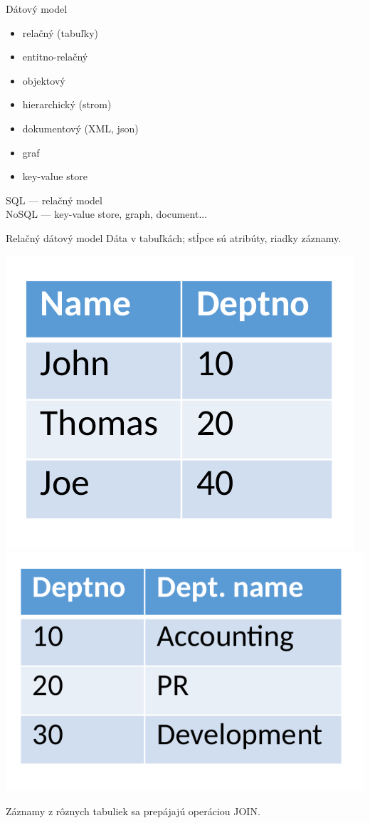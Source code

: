 \documentclass[12pt]{beamer}
\begin{document}
\begin{frame}{Dátový model}
\begin{itemize}
\item relačný (tabuľky)
\item entitno-relačný
\item objektový
\item hierarchický (strom)
\item dokumentový (XML, json)
\item graf
\item key-value store
\end{itemize}
\bigskip
SQL --- relačný model\\
NoSQL --- key-value store, graph, document...
\end{frame}

\begin{frame}{Relačný dátový model}
Dáta v tabuľkách; stĺpce sú atribúty, riadky záznamy.

\includegraphics[scale=.25]{rel1.png}
\includegraphics[scale=.25]{rel2.png}

Záznamy z rôznych tabuliek sa prepájajú operáciou JOIN.
\end{frame}
\end{document}
